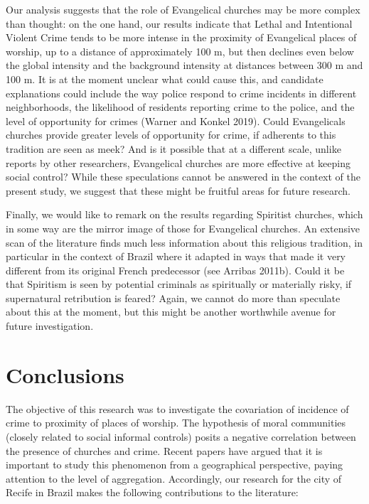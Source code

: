 \documentclass[smallextended]{svjour3}       %
\begin{document}
Our analysis suggests that the role of Evangelical churches may be more
complex than thought: on the one hand, our results indicate that Lethal
and Intentional Violent Crime tends to be more intense in the proximity
of Evangelical places of worship, up to a distance of approximately 100
m, but then declines even below the global intensity and the background
intensity at distances between 300 m and 100 m. It is at the moment
unclear what could cause this, and candidate explanations could include
the way police respond to crime incidents in different neighborhoods,
the likelihood of residents reporting crime to the police, and the level
of opportunity for crimes (Warner and Konkel 2019). Could Evangelicals
churches provide greater levels of opportunity for crime, if adherents
to this tradition are seen as meek? And is it possible that at a
different scale, unlike reports by other researchers, Evangelical
churches are more effective at keeping social control? While these
speculations cannot be answered in the context of the present study, we
suggest that these might be fruitful areas for future research.

Finally, we would like to remark on the results regarding Spiritist
churches, which in some way are the mirror image of those for
Evangelical churches. An extensive scan of the literature finds much
less information about this religious tradition, in particular in the
context of Brazil where it adapted in ways that made it very different
from its original French predecessor (see Arribas 2011b). Could it be
that Spiritism is seen by potential criminals as spiritually or
materially risky, if supernatural retribution is feared? Again, we
cannot do more than speculate about this at the moment, but this might
be another worthwhile avenue for future investigation.

\hypertarget{conclusions}{%
\section{Conclusions}\label{conclusions}}

The objective of this research was to investigate the covariation of
incidence of crime to proximity of places of worship. The hypothesis of
moral communities (closely related to social informal controls) posits a
negative correlation between the presence of churches and crime. Recent
papers have argued that it is important to study this phenomenon from a
geographical perspective, paying attention to the level of aggregation.
Accordingly, our research for the city of Recife in Brazil makes the
following contributions to the literature:
\end{document}

